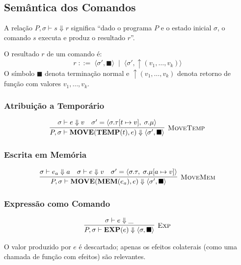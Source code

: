 \subsection{Semântica dos Comandos}\label{sec:irt-stmt-sem}

A relação $P, \sigma \vdash s \Downarrow r$ significa
``dado o programa $P$ e o estado inicial $\sigma$, o comando $s$ executa e
produz o resultado $r$''.

\begin{Definition}\label{def:irt-result}
  O resultado $r$ de um comando é:
  \[
    r \;::=\; \langle \sigma', \blacksquare \rangle
    \;\mid\; \langle \sigma', \uparrow (v_1,\ldots,v_k) \rangle
  \]
  O símbolo $\blacksquare$ denota terminação normal e
  $\uparrow(v_1,\ldots,v_k)$ denota retorno de função com valores
  $v_1,\ldots,v_k$.
\end{Definition}

\subsubsection*{Atribuição a Temporário}

\[
  \infer[\textsc{MoveTemp}]
  {P, \sigma \vdash \mathbf{MOVE}(\mathbf{TEMP}(t), e)
  \Downarrow \langle \sigma', \blacksquare \rangle}
  {\sigma \vdash e \Downarrow v \quad
  \sigma' = \langle \sigma.\tau[t \mapsto v],\; \sigma.\mu \rangle}
\]

\subsubsection*{Escrita em Memória}

\[
  \infer[\textsc{MoveMem}]
  {P, \sigma \vdash \mathbf{MOVE}(\mathbf{MEM}(e_a), e)
  \Downarrow \langle \sigma', \blacksquare \rangle}
  {\sigma \vdash e_a \Downarrow a \quad
    \sigma \vdash e   \Downarrow v \quad
  \sigma' = \langle \sigma.\tau,\; \sigma.\mu[a \mapsto v] \rangle}
\]

\subsubsection*{Expressão como Comando}

\[
  \infer[\textsc{Exp}]
  {P, \sigma \vdash \mathbf{EXP}(e) \Downarrow \langle \sigma,
  \blacksquare \rangle}
  {\sigma \vdash e \Downarrow \_}
\]

O valor produzido por $e$ é descartado; apenas os efeitos colaterais (como
uma chamada de função com efeitos) são relevantes.

